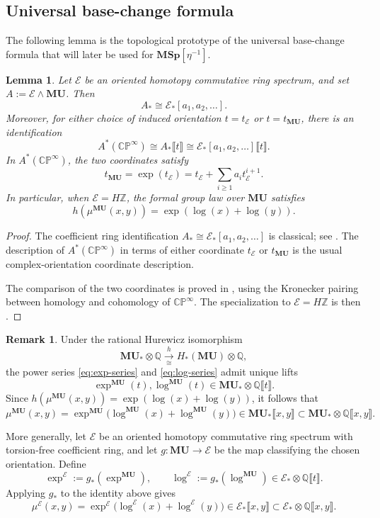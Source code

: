 \documentclass[a4paper]{amsart}
\theoremstyle{plain}
\newtheorem{lemma}[subsubsection]{Lemma}
\theoremstyle{definition}
\newtheorem{remark}[subsubsection]{Remark}
\newcommand{\MSp}{\mathbf{MSp}}
\newcommand{\MU}{\mathbf{MU}}
\newcommand{\etainv}{\eta^{-1}}
\newcommand{\MSpetainv}{{\MSp[\etainv]}}
\newcommand{\E}{\mathcal{E}}
\newcommand{\ZZ}{\mathbb{Z}}
\newcommand{\QQ}{\mathbb{Q}}
\renewcommand{\ge}{\geqslant}
\begin{document}
\subsection{Universal base-change formula}
The following lemma is the topological prototype of the universal base-change formula that will later be used for $\MSpetainv$.

\begin{lemma}
	Let $\E$ be an oriented homotopy commutative ring spectrum, and set $A:=\E\wedge\MU$. Then
	\[
		A_{\ast} \cong \E_*[a_1,a_2,\ldots].
	\]
	Moreover, for either choice of induced orientation $t=t_{\E}$ or $t=t_{\MU}$, there is an identification
	\[
		A^{\ast}(\mathbb{CP}^{\infty}) \cong A_* \llbracket t \rrbracket \cong \E_*[a_1,a_2,\ldots]\llbracket t \rrbracket.
	\]
	In $A^{\ast}(\mathbb{CP}^{\infty})$, the two coordinates satisfy
	\[
		t_{\MU}=\exp(t_{\E})=t_{\E}+\sum_{i\ge 1}a_i t_{\E}^{i+1}.
	\]
	In particular, when $\E=H\ZZ$, the formal group law over $\MU$ satisfies
	\[
		h(\mu^{\MU}(x,y)) = \exp(\log(x) + \log(y)).
	\]
\end{lemma}
\begin{proof}
	The coefficient ring identification $A_*\cong \E_*[a_1,a_2,\ldots]$ is classical; see \cite[Part II, \S 4, Lemma 4.5(ii)]{adams1974stable}. The description of $A^*(\mathbb{CP}^{\infty})$ in terms of either coordinate $t_{\E}$ or $t_{\MU}$ is the usual complex-orientation coordinate description.

	The comparison of the two coordinates is proved in \cite[Lemma II.6.3]{adams1974stable}, using the Kronecker pairing between homology and cohomology of $\mathbb{CP}^{\infty}$. The specialization to $\E=H\ZZ$ is then \cite[Corollary II.6.6]{adams1974stable}.
\end{proof}
\begin{remark}
	Under the rational Hurewicz isomorphism
	\[
		\MU_* \otimes \QQ \xrightarrow[\cong]{h} H_*(\MU)\otimes \QQ,
	\]
	the power series \eqref{eq:exp-series} and \eqref{eq:log-series} admit unique lifts
	\[
		\exp^{\MU}(t), \log^{\MU}(t) \in \MU_* \otimes \QQ \llbracket t \rrbracket.
	\]
	Since $h(\mu^{\MU}(x,y))=\exp(\log(x)+\log(y))$, it follows that
	\[
		\mu^{\MU}(x,y)=\exp^{\MU}\bigl(\log^{\MU}(x)+\log^{\MU}(y)\bigr)
		\in \MU_* \llbracket x,y \rrbracket \subset \MU_* \otimes \QQ \llbracket x,y \rrbracket.
	\]

	More generally, let $\E$ be an oriented homotopy commutative ring spectrum with torsion-free coefficient ring, and let $g:\MU\to \E$ be the map classifying the chosen orientation. Define
	\[
		\exp^{\E}:=g_*(\exp^{\MU}), \qquad \log^{\E}:=g_*(\log^{\MU})
		\in \E_* \otimes \QQ \llbracket t \rrbracket.
	\]
	Applying $g_*$ to the identity above gives
	\[
		\mu^{\E}(x,y)=\exp^{\E}\bigl(\log^{\E}(x)+\log^{\E}(y)\bigr)
		\in \E_* \llbracket x,y \rrbracket \subset \E_* \otimes \QQ \llbracket x,y \rrbracket.
	\]
\end{remark}
\end{document}
